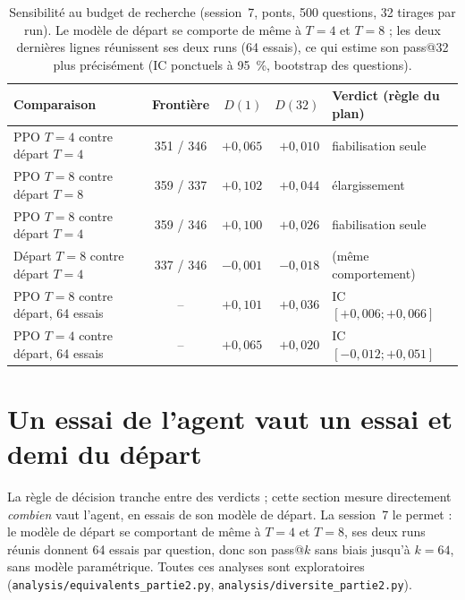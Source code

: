 \documentclass[11pt,a4paper]{article}
\begin{document}
\begin{table}[h]\centering\small
\begin{tabular}{>{\raggedright\arraybackslash}p{4.4cm}crrl}\toprule
Comparaison & Frontière & $D(1)$ & $D(32)$ & Verdict (règle du plan)\\\midrule
PPO $T = 4$ contre départ $T = 4$ & 351 / 346 & $+0{,}065$ & $+0{,}010$ & fiabilisation seule\\
PPO $T = 8$ contre départ $T = 8$ & 359 / 337 & $+0{,}102$ & $+0{,}044$ & élargissement\\
PPO $T = 8$ contre départ $T = 4$ & 359 / 346 & $+0{,}100$ & $+0{,}026$ & fiabilisation seule\\
Départ $T = 8$ contre départ $T = 4$ & 337 / 346 & $-0{,}001$ & $-0{,}018$ & (même comportement)\\
PPO $T = 8$ contre départ, 64 essais & -- & $+0{,}101$ & $+0{,}036$ & IC $[+0{,}006 ; +0{,}066]$\\
PPO $T = 4$ contre départ, 64 essais & -- & $+0{,}065$ & $+0{,}020$ & IC $[-0{,}012 ; +0{,}051]$\\\bottomrule
\end{tabular}
\caption{Sensibilité au budget de recherche (session~7, ponts, 500 questions, 32 tirages par run). Le modèle de départ se comporte de même à $T = 4$ et $T = 8$ ; les deux dernières lignes réunissent ses deux runs (64 essais), ce qui estime son pass@32 plus précisément (IC ponctuels à 95~\%, bootstrap des questions).}\label{tab:budget}
\end{table}

\section{Un essai de l'agent vaut un essai et demi du départ}\label{sec:equivalents-p2}

La règle de décision tranche entre des verdicts ; cette section mesure directement \emph{combien} vaut l'agent, en essais de son modèle de départ. La session~7 le permet : le modèle de départ se comportant de même à $T = 4$ et $T = 8$, ses deux runs réunis donnent 64 essais par question, donc son pass@$k$ sans biais jusqu'à $k = 64$, sans modèle paramétrique. Toutes ces analyses sont exploratoires (\texttt{analysis/equivalents\_partie2.py}, \texttt{analysis/diversite\_partie2.py}).
\end{document}
